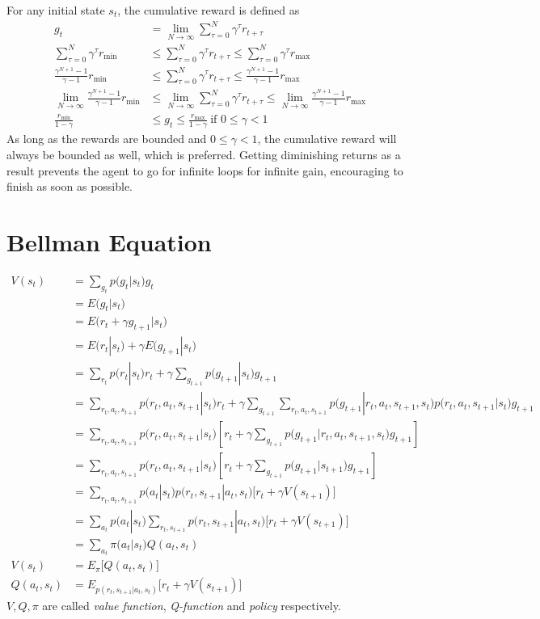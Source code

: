 \documentclass{book}
\numberwithin{equation}{subsection}
\begin{document}
For any initial state $s_t$, the cumulative reward is defined as
\begin{align}
    g_t &= \lim_{N\rightarrow\infty}\sum_{\tau=0}^N \gamma^\tau r_{t+\tau}\\
    \sum_{\tau=0}^N \gamma^\tau r_{\min} &\leq\sum_{\tau=0}^N \gamma^\tau r_{t+\tau}\leq\sum_{\tau=0}^N \gamma^\tau r_{\max}\\
    \frac{\gamma^{N+1}-1}{\gamma-1}r_{\min} &\leq\sum_{\tau=0}^N \gamma^\tau r_{t+\tau}\leq\frac{\gamma^{N+1}-1}{\gamma-1}r_{\max}\\
    \lim_{N\rightarrow\infty}\frac{\gamma^{N+1}-1}{\gamma-1}r_{\min} &\leq\lim_{N\rightarrow\infty}\sum_{\tau=0}^N \gamma^\tau r_{t+\tau}\leq\lim_{N\rightarrow\infty}\frac{\gamma^{N+1}-1}{\gamma-1}r_{\max}\\
    \frac{r_{\min}}{1-\gamma} &\leq g_t\leq\frac{r_{\max}}{1-\gamma}\ \scriptstyle{\text{if $0 \leq \gamma < 1$}}
\end{align}
As long as the rewards are bounded and $0 \leq \gamma < 1$, the cumulative reward will always be bounded as well, which is preferred. Getting diminishing returns as a result prevents the agent to go for infinite loops for infinite gain, encouraging to finish as soon as possible.
\section{Bellman Equation}
\begin{align}
    V(s_t)
    &= \sum_{g_t}p\big(g_t|s_t\big)g_t\\
    &= E\big(g_t|s_t\big)\\
    &= E\big(r_{t}+\gamma g_{t+1}|s_t\big)\\
    &= E(r_t|s_t)+\gamma E\big(g_{t+1}|s_t\big)\\
    &= \sum_{r_t}p\big(r_t|s_t\big)r_t+\gamma \sum_{g_{t+1}}p\big(g_{t+1}|s_t\big)g_{t+1}\\
    &= \sum_{r_t,a_t,s_{t+1}}p\big(r_t,a_t,s_{t+1}|s_t\big)r_t+\gamma \sum_{g_{t+1}}\sum_{r_t,a_t,s_{t+1}}p\big(g_{t+1}|r_t,a_t,s_{t+1},s_t\big)p\big(r_t,a_t,s_{t+1}|s_t\big)g_{t+1}\\
    &= \sum_{r_t,a_t,s_{t+1}}p\big(r_t,a_t,s_{t+1}|s_t\big)\left[r_t+\gamma \sum_{g_{t+1}}p\big(g_{t+1}|r_t,a_t,s_{t+1},s_t\big)g_{t+1}\right]\\
    &= \sum_{r_t,a_t,s_{t+1}}p\big(r_t,a_t,s_{t+1}|s_t\big)\left[r_t+\gamma \sum_{g_{t+1}}p\big(g_{t+1}|s_{t+1}\big)g_{t+1}\right]\\
    &= \sum_{r_t,a_t,s_{t+1}}p\big(a_t|s_t\big)p\big(r_t,s_{t+1}|a_t,s_t\big)\big[r_t+\gamma V(s_{t+1})\big]\\
    &= \sum_{a_t}p\big(a_t|s_t\big)\sum_{r_t,s_{t+1}}p\big(r_t,s_{t+1}|a_t,s_t\big)\big[r_t+\gamma V(s_{t+1})\big]\\
    &= \sum_{a_t}\pi\big(a_t|s_t\big)Q(a_t, s_t)\\
    V(s_t) &= E_\pi\big[Q(a_t, s_t)\big]\label{valueexp}\\
    Q(a_t, s_t) &= E_{p(r_t,s_{t+1}|a_t,s_t)}\big[r_t+\gamma V(s_{t+1})\big]
\end{align}
$V, Q, \pi$ are called \textit{value function}, \textit{Q-function} and \textit{policy} respectively.
\end{document}

